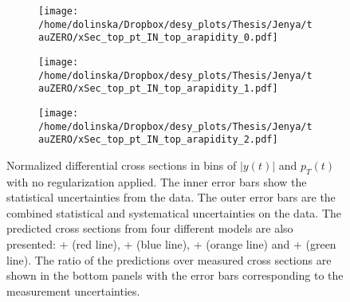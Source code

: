 \begin{figure}[h]
\centering
\begin{subfigure}
  \centering
  \texttt{[image: /home/dolinska/Dropbox/desy\_plots/Thesis/Jenya/tauZERO/xSec\_top\_pt\_IN\_top\_arapidity\_0.pdf]}
\end{subfigure}
\begin{subfigure}
  \centering
  \texttt{[image: /home/dolinska/Dropbox/desy\_plots/Thesis/Jenya/tauZERO/xSec\_top\_pt\_IN\_top\_arapidity\_1.pdf]}
\end{subfigure}
\begin{subfigure}
  \centering
  \texttt{[image: /home/dolinska/Dropbox/desy\_plots/Thesis/Jenya/tauZERO/xSec\_top\_pt\_IN\_top\_arapidity\_2.pdf]}
\end{subfigure}
\caption{Normalized differential cross sections in bins of $|y(t)|$ and $p_{T}(t)$ with no regularization applied. The inner error bars show the statistical 
         uncertainties from the data. The outer error bars are the combined statistical and systematical uncertainties on the data. The predicted cross 
         sections from four different models are also presented: \MG + \PYTHIA (red line), \Powheg + \PYTHIA (blue line), \Powheg + \HERWIG (orange line) and 
         \MCNLO + \HERWIG (green line). The ratio of the predictions over measured cross sections are shown in the bottom panels with the error bars 
         corresponding to the measurement uncertainties.}
\label{fig:XSec_zerotau}
\end{figure}